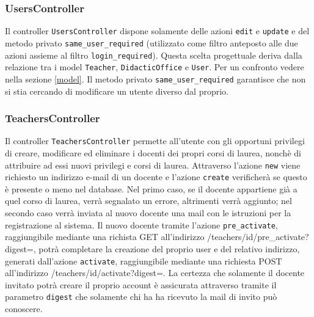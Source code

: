 \documentclass[11pt,a4paper]{article}
\begin{document}
\subsubsection{UsersController}
Il controller \verb|UsersController| dispone solamente delle azioni \verb|edit| e \verb|update| e del metodo privato \verb|same_user_required| (utilizzato come filtro anteposto alle due azioni assieme al filtro \verb|login_required|). Questa scelta progettuale deriva dalla relazione tra i model \verb|Teacher|, \verb|DidacticOffice| e \verb|User|. Per un confronto vedere nella sezione \ref{model}.
Il metodo privato \verb|same_user_required| garantisce che non si stia cercando di modificare un utente diverso dal proprio.
\subsubsection{TeachersController}
Il controller \verb|TeachersController| permette all'utente con gli opportuni privilegi di creare, modificare ed eliminare i docenti dei propri corsi di laurea, nonchè di attribuire ad essi nuovi privilegi e corsi di laurea. Attraverso l'azione \verb|new| viene richiesto un indirizzo e-mail di un docente e l'azione \verb|create| verificherà se questo è presente o meno nel database. Nel primo caso, se il docente appartiene già a quel corso di laurea, verrà segnalato un errore, altrimenti verrà aggiunto; nel secondo caso verrà inviata al nuovo docente una mail con le istruzioni per la registrazione al sistema. Il nuovo docente tramite l'azione \verb|pre_activate|, raggiungibile mediante una richista GET all'indirizzo /teachers/id/pre\_activate?digest=, potrà completare la creazione del proprio user e del relativo indirizzo, generati dall'azione \verb|activate|, raggiungibile mediante una richiesta POST all'indirizzo /teachers/id/activate?digest=. La certezza che solamente il docente invitato potrà creare il proprio account è assicurata attraverso tramite il parametro \verb|digest| che solamente chi ha ha ricevuto la mail di invito può conoscere.
\end{document}
